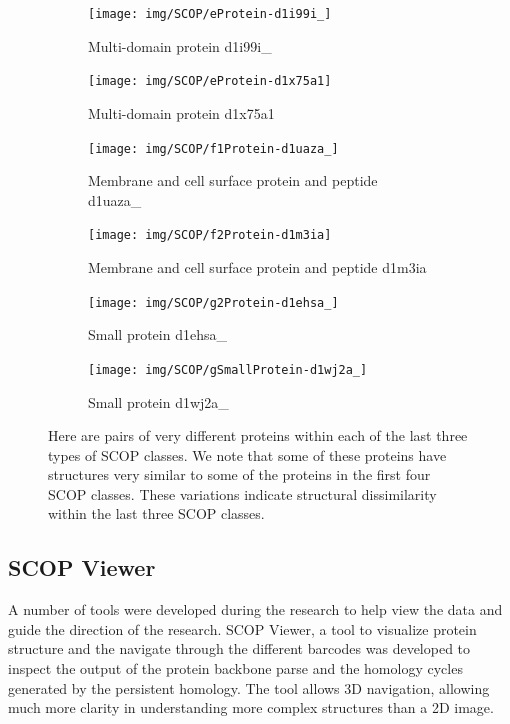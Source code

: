 \documentclass[12pt, a4paper, twocolumn, fullpage]{article}
\theoremstyle{plain}
\theoremstyle{definition}
\theoremstyle{remark}
\begin{document}
\begin{figure}
\centering
\begin{subfigure}{.5\textwidth}
  \centering
  \texttt{[image: img/SCOP/eProtein-d1i99i\_]}
  \caption{Multi-domain protein d1i99i\_}
  \label{e1}
\end{subfigure}%
\begin{subfigure}{.5\textwidth}
  \centering
  \texttt{[image: img/SCOP/eProtein-d1x75a1]}
  \caption{Multi-domain protein d1x75a1}
  \label{e2}
\end{subfigure}

\begin{subfigure}{.45\textwidth}
  \centering
  \texttt{[image: img/SCOP/f1Protein-d1uaza\_]}
  \caption{Membrane and cell surface protein and peptide d1uaza\_}
  \label{f1}
\end{subfigure}%
\begin{subfigure}{.45\textwidth}
  \centering
  \texttt{[image: img/SCOP/f2Protein-d1m3ia]}
  \caption{Membrane and cell surface protein and peptide d1m3ia}
  \label{f2}
\end{subfigure}%

\begin{subfigure}{.5\textwidth}
  \centering
  \texttt{[image: img/SCOP/g2Protein-d1ehsa\_]}
  \caption{Small protein d1ehsa\_}
  \label{g1}
\end{subfigure}%
\begin{subfigure}{.5\textwidth}
  \centering
  \texttt{[image: img/SCOP/gSmallProtein-d1wj2a\_]}
  \caption{Small protein d1wj2a\_}
  \label{g2}
\end{subfigure}%
\caption{Here are pairs of very different proteins within each of the last three types of SCOP classes. We note that some of these proteins have structures very similar to some of the proteins in the first four SCOP classes. These variations indicate structural dissimilarity within the last three SCOP classes.}
\label{fig:SCOPClass-efg}
\end{figure}

\subsection{SCOP Viewer}
A number of tools were developed during the research to help view the data and guide the direction of the research. SCOP Viewer, a tool to visualize protein structure and the navigate through the different barcodes was developed to inspect the output of the protein backbone parse and the homology cycles generated by the persistent homology. The tool allows 3D navigation, allowing much more clarity in understanding more complex structures than a 2D image.
\end{document}
